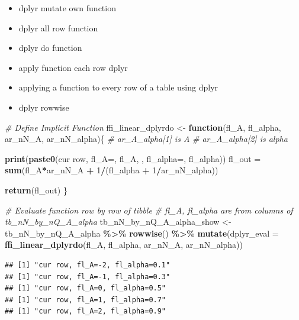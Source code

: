 \documentclass[
]{book}
\newenvironment{Shaded}{\begin{snugshade}}{\end{snugshade}}
\newcommand{\CommentTok}[1]{\textcolor[rgb]{0.56,0.35,0.01}{\textit{#1}}}
\newcommand{\ControlFlowTok}[1]{\textcolor[rgb]{0.13,0.29,0.53}{\textbf{#1}}}
\newcommand{\DataTypeTok}[1]{\textcolor[rgb]{0.13,0.29,0.53}{#1}}
\newcommand{\DecValTok}[1]{\textcolor[rgb]{0.00,0.00,0.81}{#1}}
\newcommand{\KeywordTok}[1]{\textcolor[rgb]{0.13,0.29,0.53}{\textbf{#1}}}
\newcommand{\NormalTok}[1]{#1}
\newcommand{\OperatorTok}[1]{\textcolor[rgb]{0.81,0.36,0.00}{\textbf{#1}}}
\newcommand{\StringTok}[1]{\textcolor[rgb]{0.31,0.60,0.02}{#1}}
\providecommand{\tightlist}{%
  \setlength{\itemsep}{0pt}\setlength{\parskip}{0pt}}
\begin{document}
\begin{itemize}
\tightlist
\item
  dplyr mutate own function
\item
  dplyr all row function
\item
  dplyr do function
\item
  apply function each row dplyr
\item
  applying a function to every row of a table using dplyr
\item
  dplyr rowwise
\end{itemize}

\begin{Shaded}
\begin{Highlighting}[]
\CommentTok{\# Define Implicit Function}
\NormalTok{ffi\_linear\_dplyrdo \textless{}{-}}\StringTok{ }\ControlFlowTok{function}\NormalTok{(fl\_A, fl\_alpha, ar\_nN\_A, ar\_nN\_alpha)\{}
  \CommentTok{\# ar\_A\_alpha[1] is A}
  \CommentTok{\# ar\_A\_alpha[2] is alpha}

  \KeywordTok{print}\NormalTok{(}\KeywordTok{paste0}\NormalTok{(}\StringTok{\textquotesingle{}cur row, fl\_A=\textquotesingle{}}\NormalTok{, fl\_A, }\StringTok{\textquotesingle{}, fl\_alpha=\textquotesingle{}}\NormalTok{, fl\_alpha))}
\NormalTok{  fl\_out =}\StringTok{ }\KeywordTok{sum}\NormalTok{(fl\_A}\OperatorTok{*}\NormalTok{ar\_nN\_A }\OperatorTok{+}\StringTok{ }\DecValTok{1}\OperatorTok{/}\NormalTok{(fl\_alpha }\OperatorTok{+}\StringTok{ }\DecValTok{1}\OperatorTok{/}\NormalTok{ar\_nN\_alpha))}

  \KeywordTok{return}\NormalTok{(fl\_out)}
\NormalTok{\}}

\CommentTok{\# Evaluate function row by row of tibble}
\CommentTok{\# fl\_A, fl\_alpha are from columns of tb\_nN\_by\_nQ\_A\_alpha}
\NormalTok{tb\_nN\_by\_nQ\_A\_alpha\_show \textless{}{-}}\StringTok{ }\NormalTok{tb\_nN\_by\_nQ\_A\_alpha }\OperatorTok{\%\textgreater{}\%}
\StringTok{  }\KeywordTok{rowwise}\NormalTok{() }\OperatorTok{\%\textgreater{}\%}
\StringTok{  }\KeywordTok{mutate}\NormalTok{(}\DataTypeTok{dplyr\_eval =}
           \KeywordTok{ffi\_linear\_dplyrdo}\NormalTok{(fl\_A, fl\_alpha, ar\_nN\_A, ar\_nN\_alpha))}
\end{Highlighting}
\end{Shaded}

\begin{verbatim}
## [1] "cur row, fl_A=-2, fl_alpha=0.1"
## [1] "cur row, fl_A=-1, fl_alpha=0.3"
## [1] "cur row, fl_A=0, fl_alpha=0.5"
## [1] "cur row, fl_A=1, fl_alpha=0.7"
## [1] "cur row, fl_A=2, fl_alpha=0.9"
\end{verbatim}
\end{document}
